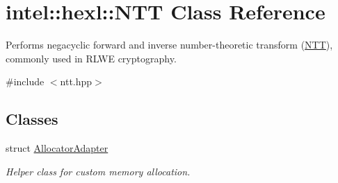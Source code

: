 \hypertarget{classintel_1_1hexl_1_1NTT}{}\section{intel\+:\+:hexl\+:\+:N\+TT Class Reference}
\label{classintel_1_1hexl_1_1NTT}


Performs negacyclic forward and inverse number-\/theoretic transform (\hyperlink{classintel_1_1hexl_1_1NTT}{N\+TT}), commonly used in R\+L\+WE cryptography.  




{\ttfamily \#include $<$ntt.\+hpp$>$}

\subsection*{Classes}
\begin{DoxyCompactItemize}
\item 
struct \hyperlink{structintel_1_1hexl_1_1NTT_1_1AllocatorAdapter}{Allocator\+Adapter}
\begin{DoxyCompactList}\small\item\em Helper class for custom memory allocation. \end{DoxyCompactList}\end{DoxyCompactItemize}
